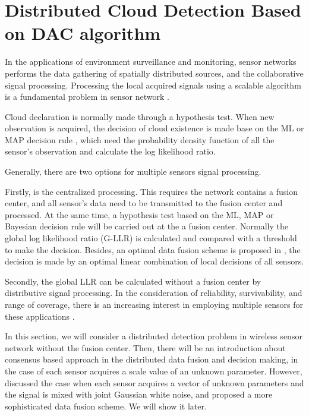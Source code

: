 \section{\label{sec:Distributed_Cloud_De}Distributed Cloud Detection Based
on DAC algorithm}

In the applications of environment surveillance and monitoring, sensor
networks performs the data gathering of spatially distributed sources,
and the collaborative signal processing. Processing the local acquired
signals using a scalable algorithm is a fundamental problem in sensor
network \cite{Olfati-Saber2005a}. 

Cloud declaration is normally made through a hypothesis test. When
new observation is acquired, the decision of cloud existence is made
base on the ML or MAP decision rule \cite{Chair1986}, which need
the probability density function of all the sensor\textquoteright{}s
observation and calculate the log likelihood ratio.

Generally, there are two options for multiple sensors signal processing.

Firstly, is the centralized processing. This requires the network
contains a fusion center, and all sensor's data need to be transmitted
to the fusion center and processed. At the same time, a hypothesis
test based on the ML, MAP or Bayesian decision rule will be carried
out at the a fusion center. Normally the global log likelihood ratio
(G-LLR) is calculated and compared with a threshold to make the decision.
Besides, an optimal data fusion scheme is proposed in \cite{Chair1986},
the decision is made by an optimal linear combination of local decisions
of all sensors. 

Secondly, the global LLR can be calculated without a fusion center
by distributive signal processing. In the consideration of reliability,
survivability, and range of coverage, there is an increasing interest
in employing multiple sensors for these applications \cite{Chair1986}.

In this section, we will consider a distributed detection problem
in wireless sensor network without the fusion center. Then, there
will be an introduction about consensus based approach in the distributed
data fusion and decision making, in the case of each sensor acquires
a scale value of an unknown parameter. However, \cite{Xiao2005} discussed
the case when each sensor acquires a vector of unknown parameters
and the signal is mixed with joint Gaussian white noise, and proposed
a more sophisticated data fusion scheme. We will show it later.

